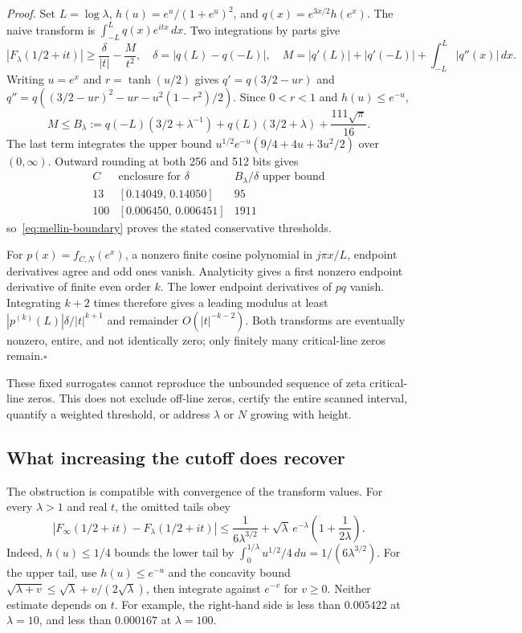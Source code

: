 \documentclass[11pt,a4paper]{article}
\begin{document}
\smallskip
\noindent\emph{Proof.}
Set $L=\log\lambda$, $h(u)=e^u/(1+e^u)^2$, and
$q(x)=e^{3x/2}h(e^x)$. The naive transform is
$\int_{-L}^L q(x)e^{itx}\,dx$. Two integrations by parts give
\begin{equation}
 |F_\lambda(1/2+it)|\geq\frac{\delta}{|t|}-\frac{M}{t^2},\quad
 \delta=|q(L)-q(-L)|,\quad
 M=|q'(L)|+|q'(-L)|+\int_{-L}^L|q''(x)|\,dx.
 \label{eq:mellin-boundary}
\end{equation}
Writing $u=e^x$ and $r=\tanh(u/2)$ gives
$q'=q(3/2-ur)$ and
$q''=q((3/2-ur)^2-ur-u^2(1-r^2)/2)$.
Since $0<r<1$ and $h(u)\leq e^{-u}$,
\[
 M\leq B_\lambda:=
 q(-L)(3/2+\lambda^{-1})+q(L)(3/2+\lambda)
 +\frac{111\sqrt{\pi}}{16}.
\]
The last term integrates the upper bound
$u^{1/2}e^{-u}(9/4+4u+3u^2/2)$ over $(0,\infty)$.
Outward rounding at both 256 and 512 bits gives
\[
\begin{array}{c|cc}
 C & \text{enclosure for }\delta & B_\lambda/\delta\text{ upper bound} \\
 \hline
 13 & [0.14049,\,0.14050] & 95 \\
 100 & [0.006450,\,0.006451] & 1911
\end{array}
\]
so~\eqref{eq:mellin-boundary} proves the stated conservative thresholds.

For $p(x)=f_{C,N}(e^x)$, a nonzero finite cosine polynomial in
$j\pi x/L$, endpoint derivatives agree and odd ones vanish. Analyticity
gives a first nonzero endpoint derivative of finite even order $k$.
The lower endpoint derivatives of $pq$ vanish. Integrating $k+2$ times
therefore gives a leading modulus at least
$|p^{(k)}(L)|\delta/|t|^{k+1}$ and remainder $O(|t|^{-k-2})$.
Both transforms are eventually nonzero, entire, and not identically
zero; only finitely many critical-line zeros remain.\hfill$\square$

These fixed surrogates cannot reproduce the unbounded sequence of
zeta critical-line zeros. This does not exclude off-line zeros,
certify the entire scanned interval, quantify a weighted threshold,
or address $\lambda$ or $N$ growing with height.

\subsection*{What increasing the cutoff does recover}

The obstruction is compatible with convergence of the transform values.
For every $\lambda>1$ and real $t$, the omitted tails obey
\begin{equation}
 \left|F_\infty(1/2+it)-F_\lambda(1/2+it)\right|
 \leq \frac{1}{6\lambda^{3/2}}
 +\sqrt\lambda\,e^{-\lambda}\left(1+\frac{1}{2\lambda}\right).
 \label{eq:mellin-tails}
\end{equation}
Indeed, $h(u)\leq1/4$ bounds the lower tail by
$\int_0^{1/\lambda}u^{1/2}/4\,du=1/(6\lambda^{3/2})$.
For the upper tail, use $h(u)\leq e^{-u}$ and the concavity bound
$\sqrt{\lambda+v}\leq\sqrt\lambda+v/(2\sqrt\lambda)$, then integrate
against $e^{-v}$ for $v\geq0$. Neither estimate depends on $t$.
For example, the right-hand side is less than $0.005422$ at
$\lambda=10$, and less than $0.000167$ at $\lambda=100$.
\end{document}
